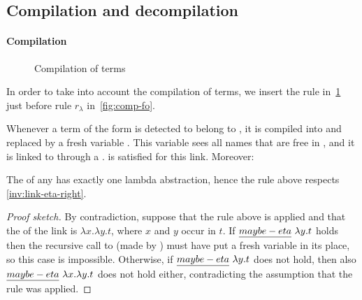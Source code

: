 
% 


\subsection{Compilation and decompilation}\label{sec:etacomp}


\paragraph*{Compilation}

\begin{figure}  
  
  \vspace{-15pt}
  \caption{Compilation of \maybeeta terms}
  \label{fig:com-maybeeta}
  \vspace{-10pt}
\end{figure}

In order to take into account the compilation of \maybeeta terms, we
insert the rule in~\cref{fig:com-maybeeta}
just before rule $r_\lambda$ in~\cref{fig:comp-fo}.

Whenever a term of the form  is detected to belong to
\maybeeta, it is compiled into  and replaced by a fresh
variable . This variable sees all names that are free in
, and it is linked to  through a
\linketa.  is satisfied for this link. 
Moreover:

\begin{corollary} \label{cor:rhs-eta-onelamb}
  The \rhs of any \linketa has exactly one lambda abstraction, hence
  the rule above respects \cref{inv:link-eta-right}.
\end{corollary}

\begin{proof}[Proof sketch]
  By contradiction, suppose that the rule above is applied and that
  the \rhs of the link is $\lambda x.\lambda y.t$, where $x$ and $y$ occur in $t$.
  If $\emph{maybe-eta}{}~\lambda y.t$ holds then the recursive call to
   (made by ) must have put a fresh variable
  in its place, so this case is impossible.
  Otherwise, if $\emph{maybe-eta}{}~\lambda y.t$ does not hold, then also
  $\emph{maybe-eta}{}~\lambda x.\lambda y.t$ does not hold either, contradicting
  the assumption that the rule was applied.
\end{proof}

